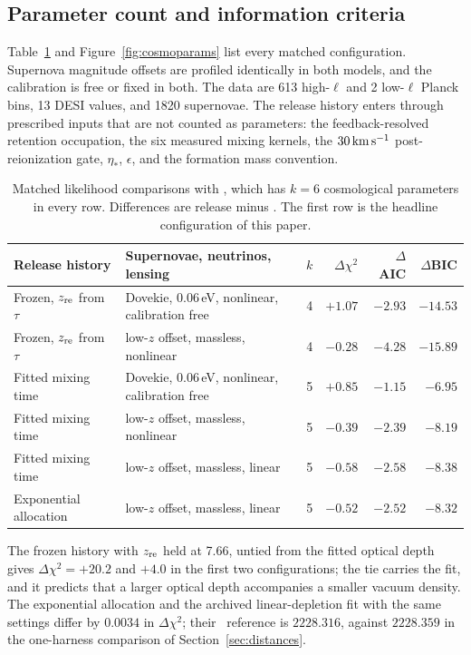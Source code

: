 \subsection{Parameter count and information criteria}
\label{sec:infocrit}
Table~\ref{tab:infocrit} and Figure~\ref{fig:cosmoparams} list every
matched configuration. Supernova
magnitude offsets are profiled identically in both models, and the
calibration is free or fixed in both. The data are 613 high-$\ell$ and 2 low-$\ell$ Planck bins, 13
DESI values, and 1820 supernovae. The release history enters through
prescribed inputs that are not counted as parameters: the feedback-resolved
retention occupation, the six measured mixing kernels, the
$30\,\mathrm{km\,s^{-1}}$ post-reionization gate, $\eta_*$, $\epsilon$, and the
formation mass convention.
\begin{table}[htbp]
\centering\small
\begin{tabular}{llrrrr}
\toprule
Release history & Supernovae, neutrinos, lensing & $k$ & $\Delta\chi^2$ & $\Delta$AIC & $\Delta$BIC\\
\midrule
Frozen, $z_{\rm re}$ from $\tau$ & Dovekie, $0.06\,$eV, nonlinear, calibration free & 4 & $+1.07$ & $-2.93$ & $-14.53$\\
Frozen, $z_{\rm re}$ from $\tau$ & low-$z$ offset, massless, nonlinear & 4 & $-0.28$ & $-4.28$ & $-15.89$\\
Fitted mixing time & Dovekie, $0.06\,$eV, nonlinear, calibration free & 5 & $+0.85$ & $-1.15$ & $-6.95$\\
Fitted mixing time & low-$z$ offset, massless, nonlinear & 5 & $-0.39$ & $-2.39$ & $-8.19$\\
Fitted mixing time & low-$z$ offset, massless, linear & 5 & $-0.58$ & $-2.58$ & $-8.38$\\
Exponential allocation & low-$z$ offset, massless, linear & 5 & $-0.52$ & $-2.52$ & $-8.32$\\
\bottomrule
\end{tabular}
\caption{Matched likelihood comparisons with \LCDM, which has $k=6$
cosmological parameters in every row. Differences are release minus
\LCDM. The first row is the headline configuration of this paper.}
\label{tab:infocrit}
\end{table}
The frozen history with $z_{\rm re}$ held at 7.66, untied from the
fitted optical depth gives $\Delta\chi^2=+20.2$ and $+4.0$ in the first
two configurations; the tie carries the fit, and it predicts that a larger
optical depth accompanies a smaller vacuum density. The exponential
allocation and the archived linear-depletion fit with the same settings
differ by $0.0034$ in $\Delta\chi^2$; their \LCDM\ reference is
$2228.316$, against $2228.359$ in the one-harness comparison of
Section~\ref{sec:distances}. 

